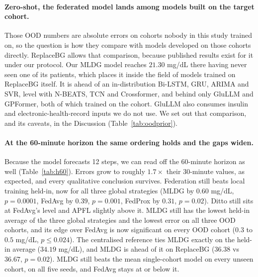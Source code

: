 \documentclass[10pt,letterpaper]{article}
\begin{document}
\paragraph{Zero-shot, the federated model lands among models built on the
target cohort.} Those OOD numbers are absolute errors on cohorts nobody in this
study trained on, so the question is how they compare with models developed on
those cohorts directly. ReplaceBG allows that comparison, because published
results exist for it under our protocol. Our MLDG model reaches $21.30$ mg/dL
there having never seen one of its patients, which places it inside the field of
models trained on ReplaceBG itself. It is ahead of an in-distribution Bi-LSTM,
GRU, ARIMA and SVR, level with N-BEATS, TCN and Crossformer, and behind only
GluLLM and GPFormer, both of which trained on the cohort. GluLLM also consumes
insulin and electronic-health-record inputs we do not use. We set out that
comparison, and its caveats, in the Discussion (Table~\ref{tab:oodprior}).

\paragraph{At the 60-minute horizon the same ordering holds and the gaps
widen.} Because the model forecasts 12 steps, we can read off the 60-minute
horizon as well (Table~\ref{tab:h60}). Errors grow to roughly $1.7\times$
their 30-minute values, as expected, and every qualitative conclusion
survives. Federation still beats local training held-in, now for all three
global strategies (MLDG by $0.60$ mg/dL, $p = 0.0001$, FedAvg by $0.39$,
$p = 0.001$, FedProx by $0.31$, $p = 0.02$). Ditto still sits at FedAvg's
level and APFL slightly above it. MLDG still has the lowest held-in average
of the three global strategies and the lowest error on all three OOD cohorts,
and its edge over FedAvg is now significant on every OOD cohort ($0.3$ to
$0.5$ mg/dL, $p \le 0.024$). The centralised reference ties MLDG exactly on
the held-in average ($34.19$ mg/dL), and MLDG is ahead of it on ReplaceBG
($36.38$ vs $36.67$, $p = 0.02$). MLDG still beats the mean single-cohort
model on every unseen cohort, on all five seeds, and FedAvg stays at or below
it.
\end{document}
